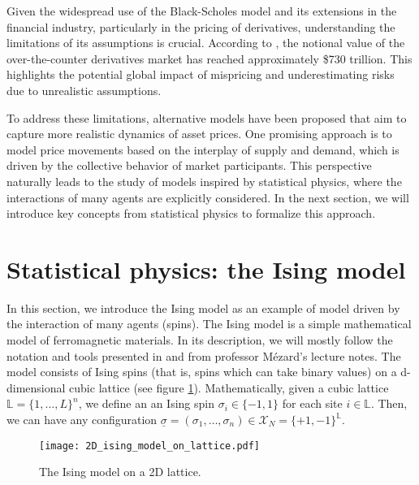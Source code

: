 Given the widespread use of the Black-Scholes model and its extensions in the financial industry, particularly in the pricing of derivatives, understanding the limitations of its assumptions is crucial. According to \cite{bis}, the notional value of the over-the-counter derivatives market has reached approximately \$730 trillion. This highlights the potential global impact of mispricing and underestimating risks due to unrealistic assumptions.

To address these limitations, alternative models have been proposed that aim to capture more realistic dynamics of asset prices. One promising approach is to model price movements based on the interplay of supply and demand, which is driven by the collective behavior of market participants. This perspective naturally leads to the study of models inspired by statistical physics, where the interactions of many agents are explicitly considered. In the next section, we will introduce key concepts from statistical physics to formalize this approach.


\section{Statistical physics: the Ising model}
In this section, we introduce the Ising model as an example of model driven by the interaction of many agents (spins). The Ising model is a simple mathematical model of ferromagnetic materials. In its description, we will mostly follow the notation and tools presented in \cite{mezard_book} and from professor Mézard's lecture notes. The model consists of Ising spins (that is, spins which can take binary values) on a d-dimensional cubic lattice (see figure \ref{fig:ising_model}). Mathematically, given a cubic lattice $\mathbb{L}=\{1,\dots,L\}^n$, we define an an Ising spin $\sigma_i\in\{-1,1\}$ for each site $i\in\mathbb{L}$. Then, we can have any configuration $\underline{\sigma} = (\sigma_1,\dots,\sigma_n) \in \mathcal{X}_N=\{+1,-1\}^{\mathbb{L}}$.

\begin{figure}[h]
    \centering
    \texttt{[image: 2D\_ising\_model\_on\_lattice.pdf]}
    \caption{The Ising model on a 2D lattice.}
    \label{fig:ising_model}
\end{figure}


